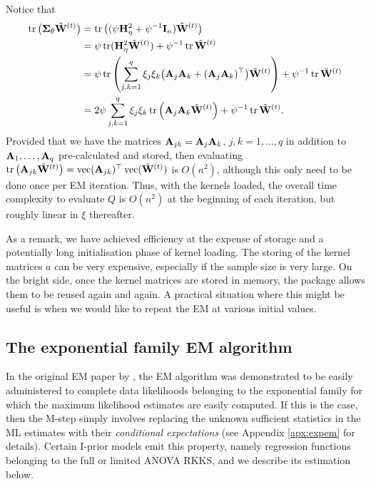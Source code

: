 Notice that
\begin{align*}
  \operatorname{tr}\big({\bm\Sigma}_\theta \tilde{\mathbf W}^{(t)}\big)
  &=  \operatorname{tr}\big( (\psi{\mathbf H}_\eta^2 + \psi^{-1}{\mathbf I}_n ) \tilde{\mathbf W}^{(t)} \big) \\
  &= \psi \operatorname{tr} ({\mathbf H}_\eta^2\tilde{\mathbf W}^{(t)}) + \psi^{-1}\operatorname{tr} \tilde{\mathbf W}^{(t)} \\
  &= \psi \operatorname{tr} \left(\sum_{j,k=1}^q \xi_j \xi_k \big({\mathbf A}_j {\mathbf A}_k + ({\mathbf A}_j {\mathbf A}_k)^\top\big)
   \tilde{\mathbf W}^{(t)}\right) + \psi^{-1}\operatorname{tr} \tilde{\mathbf W}^{(t)} \\
   &= 2\psi \sum_{j,k=1}^q \xi_j \xi_k \operatorname{tr} \left(  {\mathbf A}_j {\mathbf A}_k 
   \tilde{\mathbf W}^{(t)}\right) + \psi^{-1}\operatorname{tr} \tilde{\mathbf W}^{(t)}.
\end{align*}
Provided that we have the matrices ${\mathbf A}_{jk} = {\mathbf A}_j{\mathbf A}_k$, $j,k=1,\dots,q$ in addition to ${\mathbf A}_1,\dots,{\mathbf A}_q$ pre-calculated and stored, then evaluating $\operatorname{tr}\big({\mathbf A}_{jk} \tilde{\mathbf W}^{(t)} \big) = \operatorname{vec}({\mathbf A}_{jk})^\top \operatorname{vec}(\tilde{\mathbf W}^{(t)} )$ is $O(n^2)$, although this  only need to be done once per EM iteration.
Thus, with the kernels loaded, the overall time complexity to evaluate $Q$ is $O(n^2)$ at the beginning of each iteration, but roughly linear in $\xi$ thereafter.

As a remark, we have achieved efficiency at the expense of storage and a potentially long initialisation phase of kernel loading.
The storing of the kernel matrices $a$ can be very expensive, especially if the sample size is very large.
On the bright side, once the kernel matrices are stored in memory, the  package allows them to be reused again and again.
A practical situation where this might be useful is when we would like to repeat the EM at various initial values.

\subsection{The exponential family EM algorithm}

In the original EM paper by \citet{dempster1977maximum}, the EM algorithm was demonstrated to be easily administered to complete data likelihoods belonging to the exponential family for which the maximum likelihood estimates are easily computed.
If this is the case, then the M-step simply involves replacing the unknown sufficient statistics in the ML estimates with their \emph{conditional expectations} (see Appendix \ref{apx:expem} for details).
Certain I-prior models emit this property, namely regression functions belonging to the full or limited ANOVA RKKS, and we describe its estimation below.

